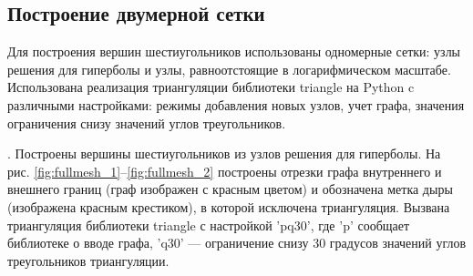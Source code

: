 \renewcommand{\addimg}[3]{
  \begin{figure}[H]
    \texttt{[image: \#1]}
    \caption{#2} \label{#3}
  \end{figure}
}

\newcommand{\addimgexp}[1]{






  \addtwoimg{exps/#1_mesh}{Триангуляция}{fig:#1_mesh}
  \addtwoimg{exps/#1_solve}{Решение потенциального поля}{fig:#1_solve}
  \addimg{exps/#1_rhog}{Кажущееся сопротивление}{fig:#1_rhog}
}


\subsection{Построение двумерной сетки}


Для построения вершин шестиугольников использованы одномерные сетки: узлы решения для гиперболы
и узлы, равноотстоящие в логарифмическом масштабе.
Использована реализация триангуляции библиотеки triangle на Python c различными настройками:
режимы добавления новых узлов, учет графа, значения ограничения снизу значений углов треугольников.


 \theexp \label{text_fullmesh}.
Построены вершины шестиугольников из узлов решения для гиперболы.
На рис. \ref{fig:fullmesh_1}--\ref{fig:fullmesh_2} построены отрезки графа внутреннего и внешнего границ (граф изображен с красным цветом)
и обозначена метка дыры (изображена красным крестиком), в которой исключена триангуляция.
Вызвана триангуляция библиотеки triangle с настройкой 'pq30',
где 'p' сообщает библиотеке о вводе графа, 'q30' --- ограничение снизу 30 градусов значений углов треугольников триангуляции.

